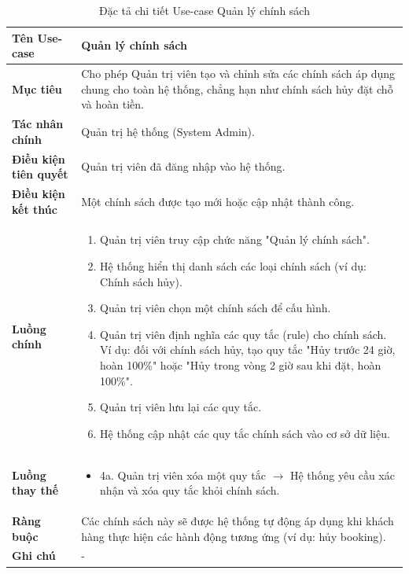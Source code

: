 \begin{table}[H]
\centering
\renewcommand{\arraystretch}{1.3}
\begin{tabular}{|p{4cm}|p{10cm}|}
\hline
\textbf{Tên Use-case} 
& Quản lý chính sách \\ 
\hline

\textbf{Mục tiêu} 
& Cho phép Quản trị viên tạo và chỉnh sửa các chính sách áp dụng chung cho toàn hệ thống, chẳng hạn như chính sách hủy đặt chỗ và hoàn tiền. \\ 
\hline

\textbf{Tác nhân chính} 
& Quản trị hệ thống (System Admin). \\ 
\hline

\textbf{Điều kiện tiên quyết} 
& Quản trị viên đã đăng nhập vào hệ thống. \\ 
\hline

\textbf{Điều kiện kết thúc} 
& Một chính sách được tạo mới hoặc cập nhật thành công. \\ 
\hline

\textbf{Luồng chính} 
& 
\begin{enumerate}
    \item Quản trị viên truy cập chức năng "Quản lý chính sách".
    \item Hệ thống hiển thị danh sách các loại chính sách (ví dụ: Chính sách hủy).
    \item Quản trị viên chọn một chính sách để cấu hình.
    \item Quản trị viên định nghĩa các quy tắc (rule) cho chính sách. Ví dụ: đối với chính sách hủy, tạo quy tắc "Hủy trước 24 giờ, hoàn 100\%" hoặc "Hủy trong vòng 2 giờ sau khi đặt, hoàn 100\%".
    \item Quản trị viên lưu lại các quy tắc.
    \item Hệ thống cập nhật các quy tắc chính sách vào cơ sở dữ liệu.
\end{enumerate} \\ 
\hline

\textbf{Luồng thay thế} 
& 
\begin{itemize}
    \item 4a. Quản trị viên xóa một quy tắc $\rightarrow$ Hệ thống yêu cầu xác nhận và xóa quy tắc khỏi chính sách.
\end{itemize} \\ 
\hline

\textbf{Ràng buộc} 
& Các chính sách này sẽ được hệ thống tự động áp dụng khi khách hàng thực hiện các hành động tương ứng (ví dụ: hủy booking). \\ 
\hline

\textbf{Ghi chú} 
& - \\ 
\hline
\end{tabular}
\caption{Đặc tả chi tiết Use-case Quản lý chính sách}
\label{tab:policy-management-spec}
\end{table}



